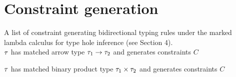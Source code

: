 \documentclass[formalism.tex]{subfiles}
\begin{document}
\section{Constraint generation}
A list of constraint generating bidirectional typing rules under the marked lambda calculus for type
hole inference (see Section 4). \\

 $\TMV$ has matched arrow type $\TArrow{\TMV_1}{\TMV_2}$ and generates constraints $C$
\begin{mathpar}

\end{mathpar}

 $\TMV$ has matched binary product type $\TProd{\TMV_1}{\TMV_2}$ and generates constraints $C$
\begin{mathpar}

\end{mathpar}
\end{document}
